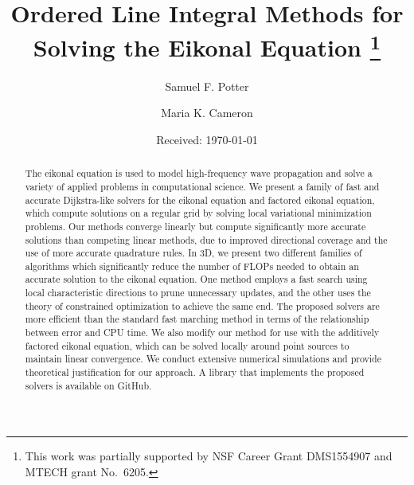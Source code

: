 \documentclass[smallcondensed]{svjour3}
\begin{document}
\title{
  Ordered Line Integral Methods for Solving the Eikonal Equation
  \footnote{This work was partially supported by NSF Career Grant
    DMS1554907 and MTECH grant No.\ 6205.}
}

\author{Samuel F. Potter \and Maria K. Cameron}


\date{Received: \today}

\maketitle

\begin{abstract}
  The eikonal equation is used to model high-frequency wave
  propagation and solve a variety of applied problems in computational
  science. We present a family of fast and accurate Dijkstra-like
  solvers for the eikonal equation and factored eikonal equation,
  which compute solutions on a regular grid by solving local
  variational minimization problems. Our methods converge linearly but
  compute significantly more accurate solutions than competing linear
  methods, due to improved directional coverage and the use of more
  accurate quadrature rules. In 3D, we present two different families
  of algorithms which significantly reduce the number of FLOPs needed
  to obtain an accurate solution to the eikonal equation. One method
  employs a fast search using local characteristic directions to prune
  unnecessary updates, and the other uses the theory of constrained
  optimization to achieve the same end. The proposed solvers are more
  efficient than the standard fast marching method in terms of the
  relationship between error and CPU time. We also modify our method
  for use with the additively factored eikonal equation, which can be
  solved locally around point sources to maintain linear
  convergence. We conduct extensive numerical simulations and provide
  theoretical justification for our approach. A library that
  implements the proposed solvers is available on GitHub.
\end{abstract}
\end{document}
